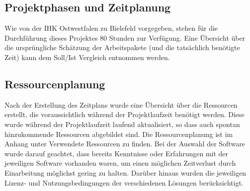 \subsection{Projektphasen und Zeitplanung}

Wie von der IHK Ostwestfalen zu Bielefeld vorgegeben, stehen für die Durchführung dieses Projektes 80 Stunden zur Verfügung. Eine Übersicht über die ursprüngliche Schätzung der Arbeitspakete (und die tatsächlich benötigte Zeit) kann dem Soll/Ist Vergleich entnommen werden.

\subsection{Ressourcenplanung}

Nach der Erstellung des Zeitplans wurde eine Übersicht über die Ressourcen erstellt, die voraussichtlich während der Projektlaufzeit benötigt werden. Diese wurde während der Projektlaufzeit laufend aktualisiert, so dass auch spontan hinzukommende Ressourcen abgebildet sind. Die Ressourcenplanung ist im Anhang unter Verwendete Ressourcen zu finden\todo. Bei der Auswahl der Software wurde darauf geachtet, dass bereits Kenntnisse oder Erfahrungen mit der jeweiligen Software vorhanden waren, um einen möglichen Zeitverlust durch Einarbeitung möglichst gering zu halten. Darüber hinaus wurden die jeweiligen Lizenz- und Nutzungsbedingungen der verschiedenen Lösungen berücksichtigt.
